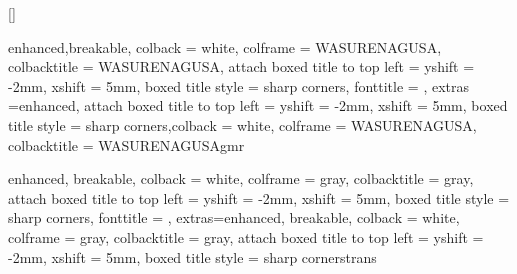 \setlength{\glossglue}{5pt plus 2pt minus 1pt}

\setmainfont{FreeSerif}
\renewcommand\th{þ}
\noautomath
[]
\titlespacing*{\subsubsection}{\parindent}{1ex}{1em}
\patchcmd{\quote}{\rightmargin}{\leftmargin 6em \rightmargin}{}{}
\makeatletter
\renewcommand\@makefntext[1]{%
    \setlength\parindent{1em}%
    \noindent
    \mbox{\textsuperscript{\@thefnmark}\,}{#1}}
\makeatother
\makeatletter
\newcommand{\dynscriptsize}{\check@mathfonts\fontsize{\sf@size}{\z@}\selectfont}
\makeatother
\newcommand\textunderset[2]{%
    \leavevmode
    \vtop{\offinterlineskip
        \halign{%
            \hfil##\hfil\cr %
            \strut#2\cr
            \noalign{\kern-.3ex}
            \dynscriptsize\strut#1\cr
        }%
    }%
}
\newcommand\textoverset[2]{%
    \leavevmode
    \vbox{\offinterlineskip
        \halign{%
            \hfil##\hfil\cr %
            \dynscriptsize\strut#1\cr
            \noalign{\kern-.3ex}
            \strut#2\cr
        }%
    }%
}

{enhanced,breakable,
    colback = white, colframe = WASURENAGUSA, colbacktitle = WASURENAGUSA,
    attach boxed title to top left = {yshift = -2mm, xshift = 5mm},
    boxed title style = {sharp corners},
    fonttitle = \sffamily, extras ={enhanced, attach boxed title to top left = {yshift = -2mm, xshift = 5mm},
            boxed title style = {sharp corners}},colback = white, colframe = WASURENAGUSA, colbacktitle = WASURENAGUSA}{gmr}

{enhanced, breakable,
    colback = white, colframe = gray, colbacktitle = gray,
    attach boxed title to top left = {yshift = -2mm, xshift = 5mm},
    boxed title style = {sharp corners},
    fonttitle = \sffamily, extras={enhanced, breakable,
            colback = white, colframe = gray, colbacktitle = gray,
            attach boxed title to top left = {yshift = -2mm, xshift = 5mm},
            boxed title style = {sharp corners}}}{trans}

